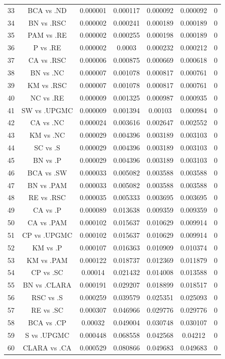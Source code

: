 \documentclass[a4paper,10pt]{article}
\begin{document}
\begin{landscape}
\begin{table}[!htp]
\begin{tabular}{ccccccc}
33&BCA vs .ND&0.000001&0.000117&0.000092&0.000092&0\\
34&BN vs .RSC&0.000002&0.000241&0.000189&0.000189&0\\
35&PAM vs .RE&0.000002&0.000255&0.000198&0.000189&0\\
36&P vs .RE&0.000002&0.0003&0.000232&0.000212&0\\
37&CA vs .RSC&0.000006&0.000875&0.000669&0.000618&0\\
38&BN vs .NC&0.000007&0.001078&0.000817&0.000761&0\\
39&KM vs .RSC&0.000007&0.001078&0.000817&0.000761&0\\
40&NC vs .RE&0.000009&0.001325&0.000987&0.000935&0\\
41&SW vs .UPGMC&0.000009&0.001394&0.00103&0.000984&0\\
42&CA vs .NC&0.000024&0.003616&0.002647&0.002552&0\\
43&KM vs .NC&0.000029&0.004396&0.003189&0.003103&0\\
44&SC vs .S&0.000029&0.004396&0.003189&0.003103&0\\
45&BN vs .P&0.000029&0.004396&0.003189&0.003103&0\\
46&BCA vs .SW&0.000033&0.005082&0.003588&0.003588&0\\
47&BN vs .PAM&0.000033&0.005082&0.003588&0.003588&0\\
48&RE vs .RSC&0.000035&0.005333&0.003695&0.003695&0\\
49&CA vs .P&0.000089&0.013638&0.009359&0.009359&0\\
50&CA vs .PAM&0.000102&0.015637&0.010629&0.009914&0\\
51&CP vs .UPGMC&0.000102&0.015637&0.010629&0.009914&0\\
52&KM vs .P&0.000107&0.016363&0.010909&0.010374&0\\
53&KM vs .PAM&0.000122&0.018737&0.012369&0.011879&0\\
54&CP vs .SC&0.00014&0.021432&0.014008&0.013588&0\\
55&BN vs .CLARA&0.000191&0.029207&0.018899&0.018517&0\\
56&RSC vs .S&0.000259&0.039579&0.025351&0.025093&0\\
57&RE vs .SC&0.000307&0.046966&0.029776&0.029776&0\\
58&BCA vs .CP&0.00032&0.049004&0.030748&0.030107&0\\
59&S vs .UPGMC&0.000448&0.068558&0.042568&0.04212&0\\
60&CLARA vs .CA&0.000529&0.080866&0.049683&0.049683&0\\

\end{tabular}
\end{table}
\end{landscape}
\end{document}
